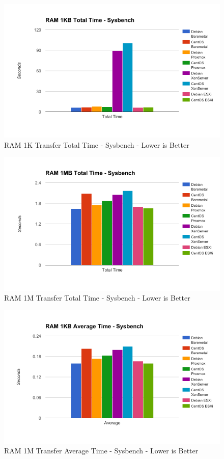 \documentclass[12pt]{spieman}  %
\begin{document}
\begin{figure}[H]
\caption{RAM 1K Transfer Total Time - Sysbench - Lower is Better}
\includegraphics[width=\textwidth,keepaspectratio]{Graphs/RAM-1K-Total}
\end{figure}

\begin{figure}[H]
\caption{RAM 1M Transfer Total Time - Sysbench - Lower is Better}
\centering
\includegraphics[width=\textwidth,keepaspectratio]{Graphs/RAM-1M-Total}
\end{figure}

\begin{figure}[H]
\caption{RAM 1M Transfer Average Time - Sysbench - Lower is Better}
\centering
\includegraphics[width=\textwidth,keepaspectratio]{Graphs/RAM-1M-Average}
\end{figure}
\end{document}
